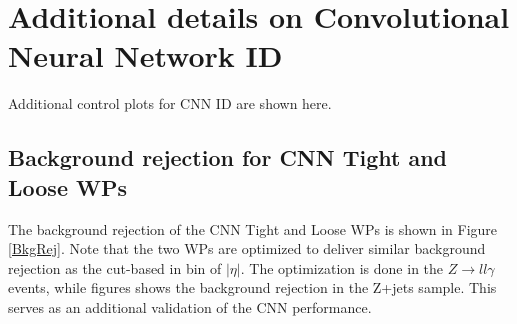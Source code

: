 \newpage
\chapter{Additional details on Convolutional Neural Network ID}
\label{Adx2}
Additional control plots for CNN ID are shown here.

\section{Background rejection for CNN Tight and Loose WPs}
\label{Adx2:BkgRej}
The background rejection of the CNN Tight and Loose WPs is shown in Figure \ref{BkgRej}. Note that the two WPs are optimized to deliver similar background rejection as the cut-based in bin of $|\eta|$. The optimization is done in the $Z\rightarrow ll\gamma$ events, while figures shows the background rejection in the Z+jets sample. This serves as an additional validation of the CNN performance. 

